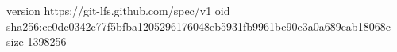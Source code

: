 version https://git-lfs.github.com/spec/v1
oid sha256:ce0de0342e77f5bfba1205296176048eb5931fb9961be90e3a0a689eab18068c
size 1398256
